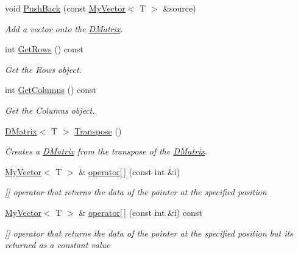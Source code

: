 \begin{DoxyCompactItemize}
void \mbox{\hyperlink{class_d_matrix_ad810420fa5ae11470778e4805c0df1c9}{Push\+Back}} (const \mbox{\hyperlink{class_my_vector}{My\+Vector}}$<$ T $>$ \&source)
\begin{DoxyCompactList}\small\item\em Add a vector onto the \mbox{\hyperlink{class_d_matrix}{D\+Matrix}}. \end{DoxyCompactList}\item 
int \mbox{\hyperlink{class_d_matrix_a0dd457392462f79180d401a09bb5c676}{Get\+Rows}} () const
\begin{DoxyCompactList}\small\item\em Get the Rows object. \end{DoxyCompactList}\item 
int \mbox{\hyperlink{class_d_matrix_a1a2b5bfdc2b11980472e4754cca4f80e}{Get\+Columns}} () const
\begin{DoxyCompactList}\small\item\em Get the Columns object. \end{DoxyCompactList}\item 
\mbox{\hyperlink{class_d_matrix}{D\+Matrix}}$<$ T $>$ \mbox{\hyperlink{class_d_matrix_a51fca60c2fdadb5684fd076fbfeecacd}{Transpose}} ()
\begin{DoxyCompactList}\small\item\em Creates a \mbox{\hyperlink{class_d_matrix}{D\+Matrix}} from the transpose of the \mbox{\hyperlink{class_d_matrix}{D\+Matrix}}. \end{DoxyCompactList}\item 
\mbox{\hyperlink{class_my_vector}{My\+Vector}}$<$ T $>$ \& \mbox{\hyperlink{class_d_matrix_a01becea742ca6c07c14c9ca645bd64f0}{operator\mbox{[}$\,$\mbox{]}}} (const int \&i)
\begin{DoxyCompactList}\small\item\em \mbox{[}\mbox{]} operator that returns the data of the pointer at the specified position \end{DoxyCompactList}\item 
\mbox{\hyperlink{class_my_vector}{My\+Vector}}$<$ T $>$ \& \mbox{\hyperlink{class_d_matrix_a2c5cfd854a492586198c69219f31a81d}{operator\mbox{[}$\,$\mbox{]}}} (const int \&i) const
\begin{DoxyCompactList}\small\item\em \mbox{[}\mbox{]} operator that returns the data of the pointer at the specified position but its returned as a constant value \end{DoxyCompactList}\item 

\end{DoxyCompactItemize}
